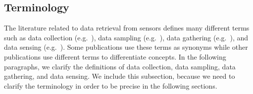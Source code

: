 
\subsection{Terminology}

The literature related to data retrieval from sensors defines many different
terms such as data collection (e.g.~\cite{laiymani2013adaptive, liu2007energy,
wang2012adaptive}), data sampling (e.g.~\cite{willett2004backcasting,
jain2004adaptive, szczytowski2010asample}), data gathering
(e.g.~\cite{wang2012data, luo2009compressive, zhang2016data}), and data sensing
(e.g.~\cite{padhy2006utility, mahmudimanesh2012balanced, duarte2005joint}).
Some publications use these terms as synonyms while other publications use
different terms to differentiate concepts. In the following paragraphs, we
clarify the definitions of data collection, data sampling, data gathering, and
data sensing. We include this subsection, because we need to clarify the
terminology in order to be precise in the following sections.

